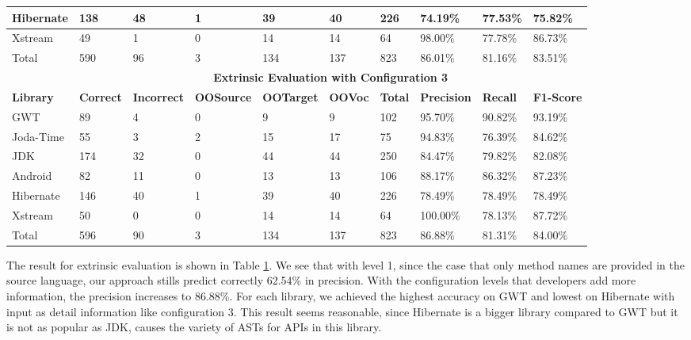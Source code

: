 \begin{table}[t]
\begin{tabular}{|l|l|l|l|l|l|l|l|l|l|}
Hibernate & 138     & 48        & 1        & 39       & 40    & 226   & 74.19\%   & 77.53\% & 75.82\%  \\ \hline
Xstream   & 49      & 1         & 0        & 14       & 14    & 64    & 98.00\%   & 77.78\% & 86.73\%  \\ \hline
Total     & 590     & 96        & 3        & 134      & 137   & 823   & 86.01\%   & 81.16\% & 83.51\%  \\ \hline
          & \multicolumn{9}{c|}{\textbf{Extrinsic Evaluation with Configuration 3}}                             \\ \hline
\textbf{Library}   & \textbf{Correct} & \textbf{Incorrect} & \textbf{OOSource} & \textbf{OOTarget} & \textbf{OOVoc}  & \textbf{Total}   & \textbf{Precision} & \textbf{Recall}  & \textbf{F1-Score} \\ \hline
GWT       & 89      & 4         & 0        & 9        & 9     & 102   & 95.70\%   & 90.82\% & 93.19\%  \\ \hline
Joda-Time & 55      & 3         & 2        & 15       & 17    & 75    & 94.83\%   & 76.39\% & 84.62\%  \\ \hline
JDK       & 174     & 32        & 0        & 44       & 44    & 250   & 84.47\%   & 79.82\% & 82.08\%  \\ \hline
Android   & 82      & 11        & 0        & 13       & 13    & 106   & 88.17\%   & 86.32\% & 87.23\%  \\ \hline
Hibernate & 146     & 40        & 1        & 39       & 40    & 226   & 78.49\%   & 78.49\% & 78.49\%  \\ \hline
Xstream   & 50      & 0         & 0        & 14       & 14    & 64    & 100.00\%  & 78.13\% & 87.72\%  \\ \hline
Total     & 596     & 90        & 3        & 134      & 137   & 823   & 86.88\%   & 81.31\% & 84.00\%  \\ \hline
\end{tabular}

\label{tbl:Extrinsic}
\end{table}

The result for extrinsic evaluation is shown in Table \ref{tbl:Extrinsic}. We see that with level 1, since the case that only method names are provided in the source language, our approach stills predict correctly 62.54\% in precision. With the configuration levels that developers add more information, the precision increases to 86.88\%. For each library, we achieved the highest accuracy on GWT and lowest on Hibernate with input as detail information like configuration 3. This result seems reasonable, since Hibernate is a bigger library compared to GWT but it is not as popular as JDK, causes the variety of ASTs for APIs in this library.




